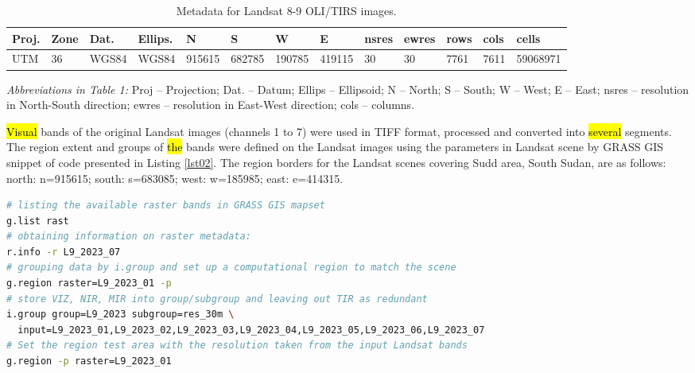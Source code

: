 \documentclass[sustainability,article,submit,pdftex,moreauthors]{Definitions/mdpi}
\begin{document}
\begin{table}[H] 
\begin{threeparttable}
\centering
\caption{Metadata for Landsat 8-9 OLI/TIRS images.\label{tab01}}
\begin{tabularx}{\textwidth}{CCCCCCCCCCCCC}
\toprule
\textbf{Proj.} & \textbf{Zone} & \textbf{Dat.} & \textbf{Ellips.} & \textbf{N} & \textbf{S} & \textbf{W} & \textbf{E} & \textbf{nsres} & \textbf{ewres} & \textbf{rows} & \textbf{cols} & \textbf{cells} \\
\midrule
UTM & 36 & WGS84 & WGS84 & 915615 & 682785 & 190785 & 419115 & 30 & 30 & 7761 & 7611 & 59068971\\
\bottomrule
\end{tabularx}
\begin{tablenotes}
      \small
      	\item \emph{Abbreviations in Table 1:}  Proj -- Projection; Dat. -- Datum; Ellips -- Ellipsoid; N -- North; S -- South; W -- West; E -- East; nsres -- resolution in North-South direction; ewres -- resolution in East-West direction; cols -- columns.
    \end{tablenotes}
  \end{threeparttable}
\end{table}

\hl{Visual} bands of the original Landsat images (channels 1 to 7) were used in TIFF format, processed and converted into \hl{several }segments. The region extent and groups of \hl{the }bands were defined on the Landsat images using the parameters in Landsat scene by GRASS GIS snippet of code presented in Listing \ref{lst02}. The region borders for the Landsat scenes covering Sudd area, South Sudan, are as follows: north: n=915615; south: s=683085; west: w=185985; east: e=414315.

\begin{lstlisting}[language=bash,caption=GRASS GIS code for creating semantic labels for the Landsat OLI/TIRS,style=mystyle,label={lst02}]
# listing the available raster bands in GRASS GIS mapset
g.list rast
# obtaining information on raster metadata:
r.info -r L9_2023_07
# grouping data by i.group and set up a computational region to match the scene
g.region raster=L9_2023_01 -p
# store VIZ, NIR, MIR into group/subgroup and leaving out TIR as redundant
i.group group=L9_2023 subgroup=res_30m \
  input=L9_2023_01,L9_2023_02,L9_2023_03,L9_2023_04,L9_2023_05,L9_2023_06,L9_2023_07
# Set the region test area with the resolution taken from the input Landsat bands
g.region -p raster=L9_2023_01
\end{lstlisting}
\end{document}
